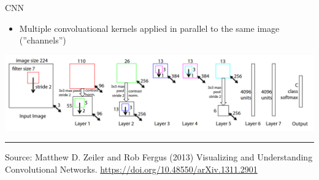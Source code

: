 \documentclass[ignorenonframetext,xcolor=x11names]{beamer}
\begin{document}
\begin{frame}{CNN}
\begin{itemize}
   \item Multiple convoluational kernels applied in parallel to the same image (''channels'')
\end{itemize} 

\vspace{\baselineskip}

\centering
\includegraphics[width=\textwidth]{screen12.png} \\
\vspace{\baselineskip}

\hrule

\vspace{\baselineskip}
\scriptsize Source: Matthew D. Zeiler and Rob Fergus (2013) Visualizing and Understanding Convolutional Networks. \url{https://doi.org/10.48550/arXiv.1311.2901}
\end{frame}
\end{document}
